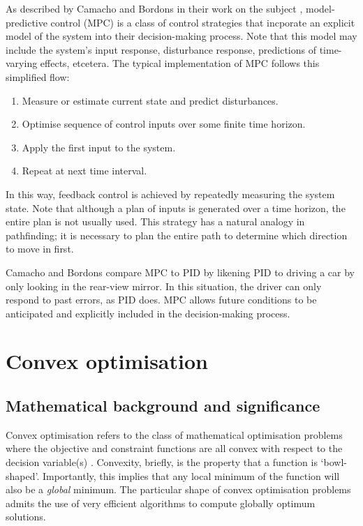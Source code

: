 As described by Camacho and Bordons in their work on the subject \cite{Camacho04}, model-predictive control (MPC) is a class of control strategies that incporate an explicit model of the system into their decision-making process.
Note that this model may include the system's input response, disturbance response, predictions of time-varying effects, etcetera.
The typical implementation of MPC follows this simplified flow:

\begin{enumerate}
	\item Measure or estimate current state and predict disturbances.
	\item Optimise sequence of control inputs over some finite time horizon.
	\item Apply the first input to the system.
	\item Repeat at next time interval.
\end{enumerate}

In this way, feedback control is achieved by repeatedly measuring the system state.
Note that although a plan of inputs is generated over a time horizon, the entire plan is not usually used.
This strategy has a natural analogy in pathfinding; it is necessary to plan the entire path to determine which direction to move in first.

Camacho and Bordons compare MPC to PID by likening PID to driving a car by only looking in the rear-view mirror.
In this situation, the driver can only respond to past errors, as PID does.
MPC allows future conditions to be anticipated and explicitly included in the decision-making process.

\section{Convex optimisation}

\subsection{Mathematical background and significance}

Convex optimisation refers to the class of mathematical optimisation problems where the objective and constraint functions are all convex with respect to the decision variable(s) \cite{Boyd04}.
Convexity, briefly, is the property that a function is `bowl-shaped'.
Importantly, this implies that any local minimum of the function will also be a {\it global} minimum.
The particular shape of convex optimisation problems admits the use of very efficient algorithms to compute globally optimum solutions.

